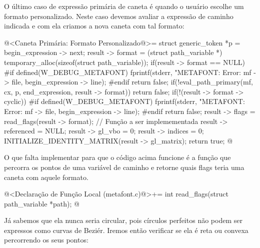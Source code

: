 {{{{{{O último caso de expressão primária de caneta é quando o usuário
escolhe um formato personalizado. Neste caso devemos avaliar a
expressão de caminho indicada e com ela criamos a nova caneta com tal
formato:

\iniciocodigo
@<Caneta Primária: Formato Personalizado@>=
struct generic_token *p = begin_expression -> next;
result -> format =
        (struct path_variable *) temporary_alloc(sizeof(struct path_variable));
if(result -> format == NULL){
#if defined(W_DEBUG_METAFONT)
  fprintf(stderr, "METAFONT: Error: %
          mf -> file, begin_expression -> line);
#endif
  return false;
}
if(!eval_path_primary(mf, cx, p, end_expression, result -> format))
  return false;
if(!(result -> format -> cyclic)){
#if defined(W_DEBUG_METAFONT)
  fprintf(stderr,
          "METAFONT: Error: %
          mf -> file, begin_expression -> line);
#endif
  return false;
}
result -> flags = read_flags(result -> format); // Função a ser implemementada
result -> referenced = NULL;
result -> gl_vbo = 0;
result -> indices = 0;
INITIALIZE_IDENTITY_MATRIX(result -> gl_matrix);
return true;
@
\fimcodigo

O que falta implementar para que o código acima funcione é a função
que percorra os pontos de uma variável de caminho e retorne quais
flags teria uma caneta com aquele formato.

\iniciocodigo
@<Declaração de Função Local (metafont.c)@>+=
int read_flags(struct path_variable *path);
@
\fimcodigo

Já sabemos que ela nunca seria circular, pois círculos perfeitos não
podem ser expressos como curvas de Beziér. Iremos então verificar se
ela é reta ou convexa percorrendo os seus pontos:

}}}}}}
